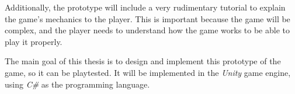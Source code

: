 Additionally, the prototype will include a very rudimentary tutorial to explain the game's mechanics to the player.
This is important because the game will be complex, and the player needs to understand how the game works to be able to play it properly.

The main goal of this thesis is to design and implement this prototype of the game, so it can be playtested.
It will be implemented in the \emph{Unity} game engine, using \emph{C\#} as the programming language.
